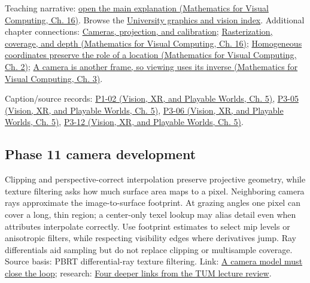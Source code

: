 Teaching narrative: \href{../02-Mathematics-for-Visual-Computing/main.pdf\#nameddest=03-visual-computing-i-ch012-rasterization-coverage-and-depth}{open the main explanation (Mathematics for Visual Computing, Ch. 16)}. Browse the \hyperref[appendix-a6d556a4ef50-university-graphics-vision-and-photography---independent-series]{University graphics and vision index}. Additional chapter connections: \hyperref[03-visual-computing-i-ch003-cameras-projection-and-calibration]{Cameras, projection, and calibration}; \href{../02-Mathematics-for-Visual-Computing/main.pdf\#nameddest=03-visual-computing-i-ch012-rasterization-coverage-and-depth}{Rasterization, coverage, and depth (Mathematics for Visual Computing, Ch. 16)}; \href{../02-Mathematics-for-Visual-Computing/main.pdf\#nameddest=01-foundations-i-ch018-homogeneous-coordinates-preserve-the-role-of-a-location}{Homogeneous coordinates preserve the role of a location (Mathematics for Visual Computing, Ch. 2)}; \href{../02-Mathematics-for-Visual-Computing/main.pdf\#nameddest=01-foundations-i-ch019-a-camera-is-another-frame-so-viewing-uses-its-inverse}{A camera is another frame, so viewing uses its inverse (Mathematics for Visual Computing, Ch. 3)}.

Caption/source records: \href{../07-Vision-XR-and-Playable-Worlds/main.pdf\#nameddest=04-visual-computing-ii-ch036-p1-02---module-1.2-course-intro-administrivia-part-2-graphics-visual-computing-2026}{P1-02 (Vision, XR, and Playable Worlds, Ch. 5)}, \href{../07-Vision-XR-and-Playable-Worlds/main.pdf\#nameddest=04-visual-computing-ii-ch036-p3-05---the-camera-transform}{P3-05 (Vision, XR, and Playable Worlds, Ch. 5)}, \href{../07-Vision-XR-and-Playable-Worlds/main.pdf\#nameddest=04-visual-computing-ii-ch036-p3-06---clipping}{P3-06 (Vision, XR, and Playable Worlds, Ch. 5)}, \href{../07-Vision-XR-and-Playable-Worlds/main.pdf\#nameddest=04-visual-computing-ii-ch036-p3-12---scan-conversion}{P3-12 (Vision, XR, and Playable Worlds, Ch. 5)}.

\subsection{Phase 11 camera development}\label{appendix-40426e4b2103-phase-11-camera-development}

\hypertarget{appendix-40426e4b2103-phase-11-camera-development}{}

Clipping and perspective-correct interpolation preserve projective geometry, while texture filtering asks how much surface area maps to a pixel. Neighboring camera rays approximate the image-to-surface footprint. At grazing angles one pixel can cover a long, thin region; a center-only texel lookup may alias detail even when attributes interpolate correctly. Use footprint estimates to select mip levels or anisotropic filters, while respecting visibility edges where derivatives jump. Ray differentials aid sampling but do not replace clipping or multisample coverage. Source basis: PBRT differential-ray texture filtering. Link: \hyperref[02-foundations-ii-ch037-a-camera-model-must-close-the-loop]{A camera model must close the loop}; research: \hyperref[02-foundations-ii-ch036-four-deeper-links-from-the-tum-lecture-review]{Four deeper links from the TUM lecture review}.


